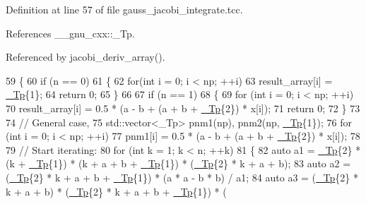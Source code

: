 Definition at line 57 of file gauss\+\_\+jacobi\+\_\+integrate.\+tcc.



References \+\_\+\+\_\+gnu\+\_\+cxx\+::\+\_\+\+Tp.



Referenced by jacobi\+\_\+deriv\+\_\+array().


\begin{DoxyCode}
59   \{
60     \textcolor{keywordflow}{if} (n == 0)
61       \{
62         \textcolor{keywordflow}{for}(\textcolor{keywordtype}{int} i = 0; i < np; ++i)
63           result\_array[i] = \hyperlink{namespace____gnu__cxx_a3b19a9c800ca194374ef9172290f7d79}{\_Tp}\{1\};
64         \textcolor{keywordflow}{return} 0;
65       \}
66 
67     \textcolor{keywordflow}{if} (n == 1)
68       \{
69         \textcolor{keywordflow}{for} (\textcolor{keywordtype}{int} i = 0; i < np; ++i)
70           result\_array[i] = 0.5 * (a - b + (a + b + \hyperlink{namespace____gnu__cxx_a3b19a9c800ca194374ef9172290f7d79}{\_Tp}\{2\}) * x[i]);
71         \textcolor{keywordflow}{return} 0;
72       \}
73 
74     \textcolor{comment}{// General case,}
75     std::vector<\_Tp> pnm1(np), pnm2(np, \hyperlink{namespace____gnu__cxx_a3b19a9c800ca194374ef9172290f7d79}{\_Tp}\{1\});
76     \textcolor{keywordflow}{for} (\textcolor{keywordtype}{int} i = 0; i < np; ++i)
77       pnm1[i] = 0.5 * (a - b + (a + b + \hyperlink{namespace____gnu__cxx_a3b19a9c800ca194374ef9172290f7d79}{\_Tp}\{2\}) * x[i]);
78 
79     \textcolor{comment}{// Start iterating:}
80     \textcolor{keywordflow}{for} (\textcolor{keywordtype}{int} k = 1; k < n; ++k)
81       \{
82         \textcolor{keyword}{auto} a1 = \hyperlink{namespace____gnu__cxx_a3b19a9c800ca194374ef9172290f7d79}{\_Tp}\{2\} * (k + \hyperlink{namespace____gnu__cxx_a3b19a9c800ca194374ef9172290f7d79}{\_Tp}\{1\}) * (k + a + b + \hyperlink{namespace____gnu__cxx_a3b19a9c800ca194374ef9172290f7d79}{\_Tp}\{1\}) * (\hyperlink{namespace____gnu__cxx_a3b19a9c800ca194374ef9172290f7d79}{\_Tp}\{2\} * k + a + b);
83         \textcolor{keyword}{auto} a2 = (\hyperlink{namespace____gnu__cxx_a3b19a9c800ca194374ef9172290f7d79}{\_Tp}\{2\} * k + a + b + \hyperlink{namespace____gnu__cxx_a3b19a9c800ca194374ef9172290f7d79}{\_Tp}\{1\}) * (a * a - b * b) / a1;
84         \textcolor{keyword}{auto} a3 = (\hyperlink{namespace____gnu__cxx_a3b19a9c800ca194374ef9172290f7d79}{\_Tp}\{2\} * k + a + b) * (\hyperlink{namespace____gnu__cxx_a3b19a9c800ca194374ef9172290f7d79}{\_Tp}\{2\} * k + a + b + \hyperlink{namespace____gnu__cxx_a3b19a9c800ca194374ef9172290f7d79}{\_Tp}\{1\}) * (

\end{DoxyCode}
